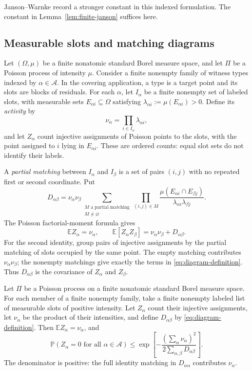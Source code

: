 Janson--Warnke \cite[Equation~(2)]{JansonWarnke2016LowerTail} record a
stronger constant in this indexed formulation. The constant in
Lemma~\ref{lem:finite-janson} suffices here.

\subsection{Measurable slots and matching diagrams}

Let $(\Omega,\mu)$ be a finite nonatomic standard Borel measure space,
and let $\Pi$ be a Poisson process of intensity $\mu$. Consider a finite
nonempty family of witness types indexed by $\alpha\in\mathcal A$.
In the covering application, a type is a target point and its slots are
blocks of residuals. For each $\alpha$, let $I_\alpha$ be a finite nonempty set of labeled
slots, with measurable sets $E_{\alpha i}\subseteq\Omega$ satisfying
$\lambda_{\alpha i}:=\mu(E_{\alpha i})>0$. Define its \emph{activity} by
\[
 \nu_\alpha=\prod_{i\in I_\alpha}\lambda_{\alpha i},
\]
and let $Z_\alpha$ count injective assignments of Poisson points to the
slots, with the point assigned to $i$ lying in $E_{\alpha i}$. These
are ordered counts: equal slot sets do not identify their labels.

A \emph{partial matching} between $I_\alpha$ and $I_\beta$ is a set
of pairs $(i,j)$ with no repeated first or second coordinate. Put
\begin{equation}
 D_{\alpha\beta}=
 \nu_\alpha\nu_\beta
 \sum_{\substack{M\text{ a partial matching}\\M\ne\varnothing}}
 \prod_{(i,j)\in M}
 \frac{\mu(E_{\alpha i}\cap E_{\beta j})}
      {\lambda_{\alpha i}\lambda_{\beta j}}.
 \label{eq:diagram-definition}
\end{equation}
The Poisson factorial-moment formula gives
\[
 \mathbb E Z_\alpha=\nu_\alpha,\qquad
 \mathbb E[Z_\alpha Z_\beta]
       =\nu_\alpha\nu_\beta+D_{\alpha\beta}.
\]
For the second identity, group pairs of injective assignments by the
partial matching of slots occupied by the same point. The empty matching
contributes $\nu_\alpha\nu_\beta$; the nonempty matchings give exactly
the terms in \eqref{eq:diagram-definition}. Thus $D_{\alpha\beta}$ is
the covariance of $Z_\alpha$ and $Z_\beta$.

\begin{proposition}
\label{prop:poisson}
Let $\Pi$ be a Poisson process on a finite nonatomic standard Borel
measure space. For each member of a finite nonempty family, take a
finite nonempty labeled list of measurable slots of positive intensity.
Let $Z_\alpha$ count their injective assignments, let $\nu_\alpha$ be
the product of their intensities, and define $D_{\alpha\beta}$ by
\eqref{eq:diagram-definition}. Then $\mathbb{E}Z_\alpha=\nu_\alpha$,
and
\begin{equation}
 \mathbb{P}(Z_\alpha=0\text{ for all }\alpha\in\mathcal A)
 \le\exp\left[-\frac{(\sum_\alpha\nu_\alpha)^2}
                        {2\sum_{\alpha,\beta}D_{\alpha\beta}}\right].
 \label{eq:poisson-janson}
\end{equation}
The denominator is positive: the full identity matching in
$D_{\alpha\alpha}$ contributes $\nu_\alpha$.
\end{proposition}

